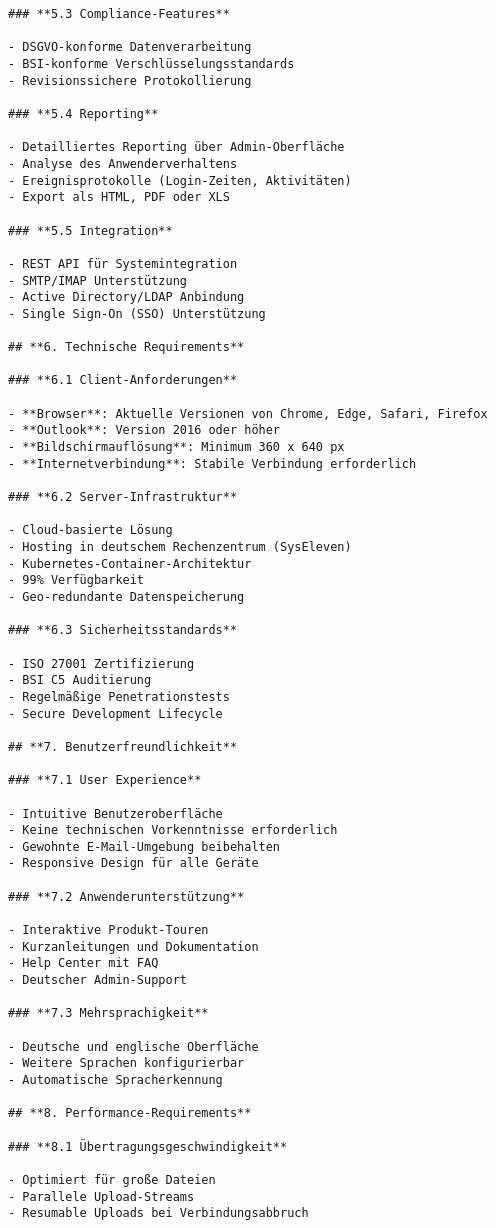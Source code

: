 \begin{Verbatim}[breaklines=true]
### **5.3 Compliance-Features**

- DSGVO-konforme Datenverarbeitung
- BSI-konforme Verschlüsselungsstandards
- Revisionssichere Protokollierung

### **5.4 Reporting**

- Detailliertes Reporting über Admin-Oberfläche
- Analyse des Anwenderverhaltens
- Ereignisprotokolle (Login-Zeiten, Aktivitäten)
- Export als HTML, PDF oder XLS

### **5.5 Integration**

- REST API für Systemintegration
- SMTP/IMAP Unterstützung
- Active Directory/LDAP Anbindung
- Single Sign-On (SSO) Unterstützung

## **6. Technische Requirements**

### **6.1 Client-Anforderungen**

- **Browser**: Aktuelle Versionen von Chrome, Edge, Safari, Firefox
- **Outlook**: Version 2016 oder höher
- **Bildschirmauflösung**: Minimum 360 x 640 px
- **Internetverbindung**: Stabile Verbindung erforderlich

### **6.2 Server-Infrastruktur**

- Cloud-basierte Lösung
- Hosting in deutschem Rechenzentrum (SysEleven)
- Kubernetes-Container-Architektur
- 99% Verfügbarkeit
- Geo-redundante Datenspeicherung

### **6.3 Sicherheitsstandards**

- ISO 27001 Zertifizierung
- BSI C5 Auditierung
- Regelmäßige Penetrationstests
- Secure Development Lifecycle

## **7. Benutzerfreundlichkeit**

### **7.1 User Experience**

- Intuitive Benutzeroberfläche
- Keine technischen Vorkenntnisse erforderlich
- Gewohnte E-Mail-Umgebung beibehalten
- Responsive Design für alle Geräte

### **7.2 Anwenderunterstützung**

- Interaktive Produkt-Touren
- Kurzanleitungen und Dokumentation
- Help Center mit FAQ
- Deutscher Admin-Support

### **7.3 Mehrsprachigkeit**

- Deutsche und englische Oberfläche
- Weitere Sprachen konfigurierbar
- Automatische Spracherkennung

## **8. Performance-Requirements**

### **8.1 Übertragungsgeschwindigkeit**

- Optimiert für große Dateien
- Parallele Upload-Streams
- Resumable Uploads bei Verbindungsabbruch


\end{Verbatim}
